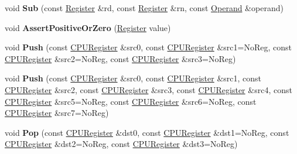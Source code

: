 \begin{DoxyCompactItemize}
\item 
\mbox{\label{classv8_1_1internal_1_1TurboAssembler_ab94aa73f22e715492e0ee8e6d40632fd}} 
void {\bfseries Sub} (const \mbox{\hyperlink{classv8_1_1internal_1_1Register}{Register}} \&rd, const \mbox{\hyperlink{classv8_1_1internal_1_1Register}{Register}} \&rn, const \mbox{\hyperlink{classv8_1_1internal_1_1Operand}{Operand}} \&operand)
\item 
\mbox{\label{classv8_1_1internal_1_1TurboAssembler_a7359d34b721166f7cc3b596cbb39112d}} 
void {\bfseries Assert\+Positive\+Or\+Zero} (\mbox{\hyperlink{classv8_1_1internal_1_1Register}{Register}} value)
\item 
\mbox{\label{classv8_1_1internal_1_1TurboAssembler_a2ef29eab0e487ed92a6aa9f147de5f54}} 
void {\bfseries Push} (const \mbox{\hyperlink{classv8_1_1internal_1_1CPURegister}{C\+P\+U\+Register}} \&src0, const \mbox{\hyperlink{classv8_1_1internal_1_1CPURegister}{C\+P\+U\+Register}} \&src1=No\+Reg, const \mbox{\hyperlink{classv8_1_1internal_1_1CPURegister}{C\+P\+U\+Register}} \&src2=No\+Reg, const \mbox{\hyperlink{classv8_1_1internal_1_1CPURegister}{C\+P\+U\+Register}} \&src3=No\+Reg)
\item 
\mbox{\label{classv8_1_1internal_1_1TurboAssembler_a192a3ec615bfb334171fb6e5ffc0f896}} 
void {\bfseries Push} (const \mbox{\hyperlink{classv8_1_1internal_1_1CPURegister}{C\+P\+U\+Register}} \&src0, const \mbox{\hyperlink{classv8_1_1internal_1_1CPURegister}{C\+P\+U\+Register}} \&src1, const \mbox{\hyperlink{classv8_1_1internal_1_1CPURegister}{C\+P\+U\+Register}} \&src2, const \mbox{\hyperlink{classv8_1_1internal_1_1CPURegister}{C\+P\+U\+Register}} \&src3, const \mbox{\hyperlink{classv8_1_1internal_1_1CPURegister}{C\+P\+U\+Register}} \&src4, const \mbox{\hyperlink{classv8_1_1internal_1_1CPURegister}{C\+P\+U\+Register}} \&src5=No\+Reg, const \mbox{\hyperlink{classv8_1_1internal_1_1CPURegister}{C\+P\+U\+Register}} \&src6=No\+Reg, const \mbox{\hyperlink{classv8_1_1internal_1_1CPURegister}{C\+P\+U\+Register}} \&src7=No\+Reg)
\item 
\mbox{\label{classv8_1_1internal_1_1TurboAssembler_a499a51f3bc90348d9a119541427625a9}} 
void {\bfseries Pop} (const \mbox{\hyperlink{classv8_1_1internal_1_1CPURegister}{C\+P\+U\+Register}} \&dst0, const \mbox{\hyperlink{classv8_1_1internal_1_1CPURegister}{C\+P\+U\+Register}} \&dst1=No\+Reg, const \mbox{\hyperlink{classv8_1_1internal_1_1CPURegister}{C\+P\+U\+Register}} \&dst2=No\+Reg, const \mbox{\hyperlink{classv8_1_1internal_1_1CPURegister}{C\+P\+U\+Register}} \&dst3=No\+Reg)

\end{DoxyCompactItemize}
